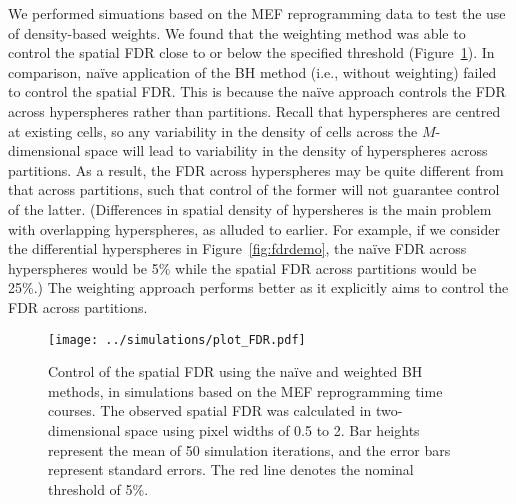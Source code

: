 \documentclass{article}
\begin{document}
We performed simuations based on the MEF reprogramming data to test the use of density-based weights.
We found that the weighting method was able to control the spatial FDR close to or below the specified threshold (Figure~\ref{fig:fdr}).
In comparison, na\"ive application of the BH method (i.e., without weighting) failed to control the spatial FDR.
This is because the na\"ive approach controls the FDR across hyperspheres rather than partitions.
Recall that hyperspheres are centred at existing cells, so any variability in the density of cells across the $M$-dimensional space will lead to variability in the density of hyperspheres across partitions.
As a result, the FDR across hyperspheres may be quite different from that across partitions, such that control of the former will not guarantee control of the latter.
(Differences in spatial density of hypersheres is the main problem with overlapping hyperspheres, as alluded to earlier.
For example, if we consider the differential hyperspheres in Figure~\ref{fig:fdrdemo}, the na\"ive FDR across hyperspheres would be 5\% while the spatial FDR across partitions would be 25\%.)
The weighting approach performs better as it explicitly aims to control the FDR across partitions.

\begin{figure}[bt]
\begin{center}
\texttt{[image: ../simulations/plot\_FDR.pdf]}
\end{center}
\caption{
    Control of the spatial FDR using the na\"ive and weighted BH methods, in simulations based on the MEF reprogramming time courses.
    The observed spatial FDR was calculated in two-dimensional space using pixel widths of 0.5 to 2.
    Bar heights represent the mean of 50 simulation iterations, and the error bars represent standard errors.
    The red line denotes the nominal threshold of 5\%.
}
\label{fig:fdr}
\end{figure}
\end{document}
